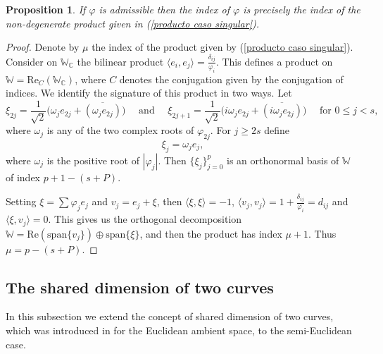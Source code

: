 \documentclass{article}
\newtheorem{prop}[thm]{Proposition}
\theoremstyle{remark}
\begin{document}
\begin{prop}\label{singular signature es el indice de la metrica}
    If $\varphi$ is admissible then the index of $\varphi$ is precisely the index of the non-degenerate product given in (\ref{producto caso singular}).
\end{prop}
\begin{proof}
    Denote by $\mu$ the index of the product given by (\ref{producto caso singular}). Consider on $\mathbb{W}_{\mathbb{C}}$ the bilinear product $\langle e_i,e_j\rangle=\frac{\delta_{ij}}{\varphi_i}$. This defines a product on $\mathbb{W}=\text{Re}_{C}(\mathbb{W}_{\mathbb{C}})$, where $C$ denotes the conjugation given by the conjugation of indices. We identify the signature of this product in two ways. Let
    $$\xi_{2j}=\frac{1}{\sqrt{2}}\Big(\omega_je_{2j}+\overline{(\omega_j e_{2j})}\Big)\quad\text{ and }\quad\xi_{2j+1}=\frac{1}{\sqrt{2}}\Big(i\omega_j e_{2j}+\overline{(i\omega_je_{2j})}\Big)\quad\text{ for }0\leq j<s,$$
    where $\omega_j$ is any of the two complex roots of $\varphi_{2j}$. For $j\geq 2s$ define
    $$\xi_j=\omega_je_j,$$
    where $\omega_j$ is the positive root of $|\varphi_j|$. Then $\{\xi_j\}_{j=0}^p$ is an orthonormal basis of $\mathbb{W}$ of index $p+1-(s+P)$.
    
    Setting $\xi=\sum \varphi_je_j$ and $v_j=e_j+\xi$, then $\langle \xi,\xi\rangle=-1$, $\langle v_j,v_j\rangle=1+\frac{\delta_{ij}}{\varphi_i}=d_{ij}$ and $\langle \xi,v_j\rangle=0$. This gives us the orthogonal decomposition $\mathbb{W}=\text{Re}(\text{span}\{v_j\})\oplus\text{span}\{\xi\}$, and then the product has index $\mu+1$. Thus $\mu=p-(s+P)$.
\end{proof}

\subsection{The shared dimension of two curves}\label{seccion shared dimension}
In this subsection we extend the concept of shared dimension of two curves, which was introduced in \cite{FF} for the Euclidean ambient space, to the semi-Euclidean case. 

\text{ }
\end{document}
